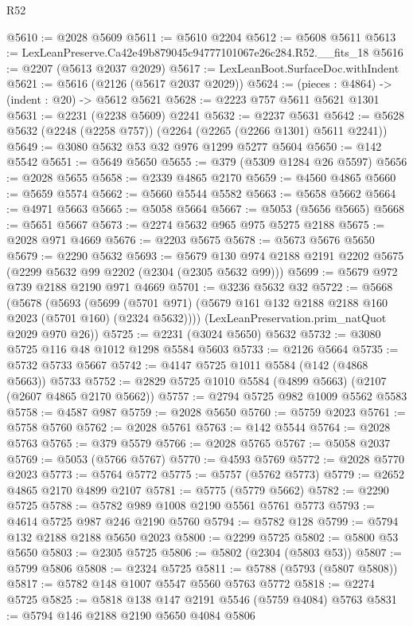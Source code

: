 \begin{lexlean}{R52}
\begin{coremodule}
@5610 := @2028 @5609
@5611 := @5610 @2204
@5612 := @5608 @5611
@5613 := LexLeanPreserve.Ca42e49b879045c94777101067e26c284.R52.__fits_18
@5616 := @2207 (@5613 @2037 @2029)
@5617 := LexLeanBoot.SurfaceDoc.withIndent
@5621 := @5616 (@2126 (@5617 @2037 @2029))
@5624 := (pieces : @4864) -> (indent : @20) -> @5612 @5621
@5628 := @2223 @757 @5611 @5621 @1301
@5631 := @2231 (@2238 @5609) @2241
@5632 := @2237 @5631
@5642 := @5628 @5632 (@2248 (@2258 @757)) (@2264 (@2265 (@2266 @1301) @5611 @2241))
@5649 := @3080 @5632 @53 @32 @976 @1299 @5277 @5604
@5650 := @142 @5542
@5651 := @5649 @5650
@5655 := @379 (@5309 @1284 @26 @5597)
@5656 := @2028 @5655
@5658 := @2339 @4865 @2170
@5659 := @4560 @4865
@5660 := @5659 @5574
@5662 := @5660 @5544 @5582
@5663 := @5658 @5662
@5664 := @4971 @5663
@5665 := @5058 @5664
@5667 := @5053 (@5656 @5665)
@5668 := @5651 @5667
@5673 := @2274 @5632 @965 @975 @5275 @2188
@5675 := @2028 @971 @4669
@5676 := @2203 @5675
@5678 := @5673 @5676 @5650
@5679 := @2290 @5632
@5693 := @5679 @130 @974 @2188 @2191 @2202 @5675 (@2299 @5632 @99 @2202 (@2304 (@2305 @5632 @99)))
@5699 := @5679 @972 @739 @2188 @2190 @971 @4669
@5701 := @3236 @5632 @32
@5722 := @5668
    (@5678
      (@5693
        (@5699 (@5701 @971) (@5679 @161 @132 @2188 @2188 @160 @2023 (@5701 @160) (@2324 @5632))))
      (LexLeanPreservation.prim_natQuot @2029 @970 @26))
@5725 := @2231 (@3024 @5650) @5632
@5732 := @3080 @5725 @116 @48 @1012 @1298 @5584 @5603
@5733 := @2126 @5664
@5735 := @5732 @5733 @5667
@5742 := @4147 @5725 @1011 @5584 (@142 (@4868 @5663)) @5733
@5752 := @2829 @5725 @1010 @5584 (@4899 @5663) (@2107 (@2607 @4865 @2170 @5662))
@5757 := @2794 @5725 @982 @1009 @5562 @5583
@5758 := @4587 @987
@5759 := @2028 @5650
@5760 := @5759 @2023
@5761 := @5758 @5760
@5762 := @2028 @5761
@5763 := @142 @5544
@5764 := @2028 @5763
@5765 := @379 @5579
@5766 := @2028 @5765
@5767 := @5058 @2037
@5769 := @5053 (@5766 @5767)
@5770 := @4593 @5769
@5772 := @2028 @5770 @2023
@5773 := @5764 @5772
@5775 := @5757 (@5762 @5773)
@5779 := @2652 @4865 @2170 @4899 @2107
@5781 := @5775 (@5779 @5662)
@5782 := @2290 @5725
@5788 := @5782 @989 @1008 @2190 @5561 @5761 @5773
@5793 := @4614 @5725 @987 @246 @2190 @5760
@5794 := @5782 @128
@5799 := @5794 @132 @2188 @2188 @5650 @2023
@5800 := @2299 @5725
@5802 := @5800 @53 @5650
@5803 := @2305 @5725
@5806 := @5802 (@2304 (@5803 @53))
@5807 := @5799 @5806
@5808 := @2324 @5725
@5811 := @5788 (@5793 (@5807 @5808))
@5817 := @5782 @148 @1007 @5547 @5560 @5763 @5772
@5818 := @2274 @5725
@5825 := @5818 @138 @147 @2191 @5546 (@5759 @4084) @5763
@5831 := @5794 @146 @2188 @2190 @5650 @4084 @5806

\end{coremodule}
\end{lexlean}
